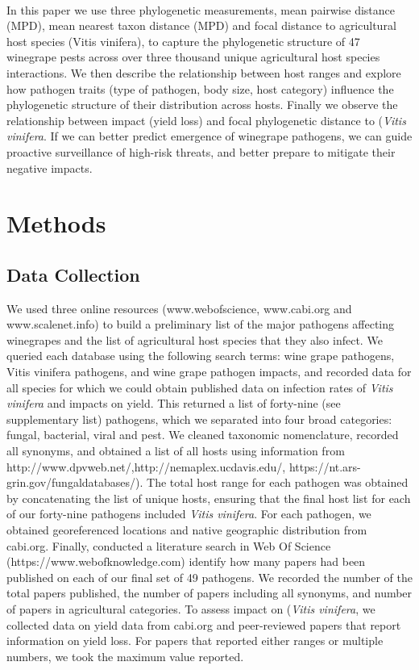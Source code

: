 \documentclass[12pt,letter]{article}
\begin{document}
\paragraph{}In this paper we use three phylogenetic measurements, mean pairwise distance (MPD), mean nearest taxon distance (MPD) and focal distance to agricultural host species (Vitis vinifera), to capture the phylogenetic structure of 47 winegrape pests across over three thousand unique agricultural host species interactions. We then describe the relationship between host ranges and explore how pathogen traits (type of pathogen, body size, host category) influence the phylogenetic structure of their distribution across hosts. Finally we observe the relationship between impact (yield loss) and focal phylogenetic distance to (\textit{Vitis vinifera}. If we can better predict emergence of winegrape pathogens, we can guide proactive surveillance of high-risk threats, and better prepare to mitigate their negative impacts. %


\section{Methods}
\subsection{Data Collection}
We used three online resources (www.webofscience, www.cabi.org and www.scalenet.info) to build a preliminary list of the major pathogens affecting winegrapes and the list of agricultural host species that they also infect. We queried each database using the following search terms: wine grape pathogens, Vitis vinifera pathogens, and wine grape pathogen impacts, and recorded data for all species for which we could obtain published data on infection rates of \textit{Vitis vinifera} and impacts on yield. This returned a list of forty-nine (see supplementary list) pathogens, which we separated into four broad categories: fungal, bacterial, viral and pest. We cleaned taxonomic nomenclature, recorded all synonyms, and obtained a list of all hosts using information from http://www.dpvweb.net/,http://nemaplex.ucdavis.edu/, https://nt.ars-grin.gov/fungaldatabases/). The total host range for each pathogen was obtained by concatenating the list of unique hosts, ensuring that the final host list for each of our forty-nine pathogens included \textit{Vitis vinifera}. 
For each pathogen, we obtained georeferenced locations and native geographic distribution from cabi.org. Finally, conducted a literature search in Web Of Science (https://www.webofknowledge.com) identify how many papers had been published on each of our final set of 49 pathogens. We recorded the number of the total papers published, the number of papers including all synonyms, and number of papers in agricultural categories. To assess impact on (\textit{Vitis vinifera}, we collected data on yield data from cabi.org and peer-reviewed papers that report information on yield loss. For papers that reported either ranges or multiple numbers, we took the maximum value reported.     
\end{document}
